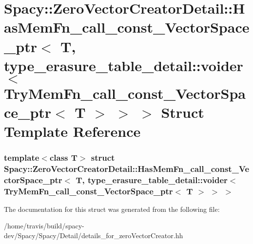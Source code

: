 \hypertarget{structSpacy_1_1ZeroVectorCreatorDetail_1_1HasMemFn__call__const__VectorSpace__ptr_3_01T_00_01typb094c3c03600c93f994f8fe7287b49ce}{\section{\-Spacy\-:\-:\-Zero\-Vector\-Creator\-Detail\-:\-:\-Has\-Mem\-Fn\-\_\-call\-\_\-const\-\_\-\-Vector\-Space\-\_\-ptr$<$ \-T, type\-\_\-erasure\-\_\-table\-\_\-detail\-:\-:voider$<$ \-Try\-Mem\-Fn\-\_\-call\-\_\-const\-\_\-\-Vector\-Space\-\_\-ptr$<$ \-T $>$ $>$ $>$ \-Struct \-Template \-Reference}
\label{structSpacy_1_1ZeroVectorCreatorDetail_1_1HasMemFn__call__const__VectorSpace__ptr_3_01T_00_01typb094c3c03600c93f994f8fe7287b49ce}
}
\subsubsection*{template$<$class T$>$ struct Spacy\-::\-Zero\-Vector\-Creator\-Detail\-::\-Has\-Mem\-Fn\-\_\-call\-\_\-const\-\_\-\-Vector\-Space\-\_\-ptr$<$ T, type\-\_\-erasure\-\_\-table\-\_\-detail\-::voider$<$ Try\-Mem\-Fn\-\_\-call\-\_\-const\-\_\-\-Vector\-Space\-\_\-ptr$<$ T $>$ $>$ $>$}



\-The documentation for this struct was generated from the following file\-:\begin{DoxyCompactItemize}
\item 
/home/travis/build/spacy-\/dev/\-Spacy/\-Spacy/\-Detail/details\-\_\-for\-\_\-zero\-Vector\-Creator.\-hh\end{DoxyCompactItemize}
